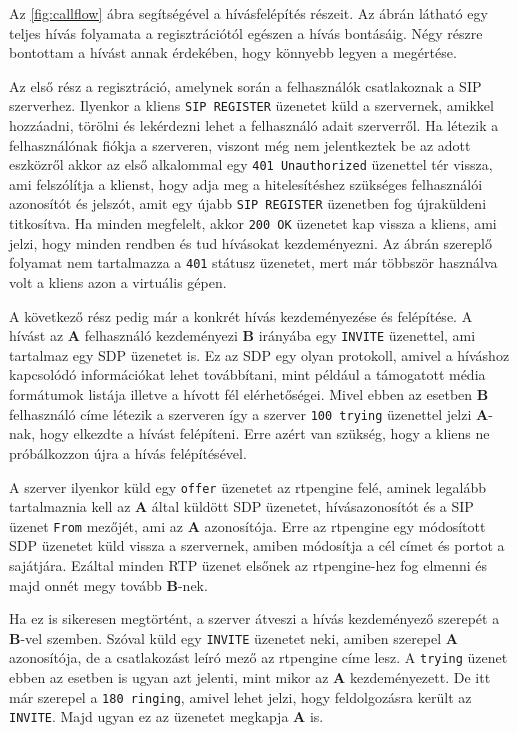 Az \ref{fig:callflow} ábra segítségével a hívásfelépítés részeit.  Az ábrán látható 
egy teljes hívás folyamata a regisztrációtól egészen a hívás bontásáig. Négy részre 
bontottam a hívást annak érdekében, hogy könnyebb legyen a megértése.

Az első rész a regisztráció, amelynek során a felhasználók csatlakoznak a SIP szerverhez.
Ilyenkor a kliens \texttt{SIP REGISTER} üzenetet küld a szervernek, amikkel hozzáadni, 
törölni és lekérdezni lehet a felhasználó adait szerverről. Ha létezik a felhasználónak 
fiókja a szerveren, viszont még nem jelentkeztek be az adott eszközről akkor az első 
alkalommal egy \texttt{401 Unauthorized} üzenettel tér vissza, ami felszólítja a klienst, 
hogy adja meg a hitelesítéshez szükséges felhasználói azonosítót és jelszót, amit egy 
újabb \texttt{SIP REGISTER} üzenetben fog újraküldeni titkosítva. Ha minden megfelelt, 
akkor \texttt{200 OK} üzenetet kap vissza a kliens, ami jelzi, hogy minden rendben és tud 
hívásokat kezdeményezni. Az ábrán szereplő folyamat nem tartalmazza a \texttt{401} 
státusz üzenetet, mert már többször használva volt a kliens azon a virtuális gépen.

A következő rész pedig már a konkrét hívás kezdeményezése és felépítése. A hívást az 
\textbf{A} felhasználó kezdeményezi \textbf{B} irányába egy \texttt{INVITE} üzenettel, 
ami tartalmaz egy SDP üzenetet is. Ez az SDP egy olyan protokoll, amivel a híváshoz 
kapcsolódó információkat lehet továbbítani, mint például a támogatott média formátumok 
listája illetve a hívott fél elérhetőségei. Mivel ebben az esetben \textbf{B} felhasználó 
címe létezik a szerveren így a szerver \texttt{100 trying} üzenettel jelzi 
\textbf{A}-nak, hogy elkezdte a hívást felépíteni. Erre azért van szükség, hogy a kliens 
ne próbálkozzon újra a hívás felépítésével.

A szerver ilyenkor küld egy \texttt{offer} üzenetet az rtpengine felé, aminek legalább 
tartalmaznia kell az \textbf{A} által küldött SDP üzenetet, hívásazonosítót és a SIP 
üzenet \texttt{From} mezőjét, ami az \textbf{A} azonosítója. Erre az rtpengine egy 
módosított SDP üzenetet küld vissza a szervernek, amiben módosítja a cél címet és portot 
a sajátjára. Ezáltal minden RTP üzenet elsőnek az rtpengine-hez fog elmenni és majd onnét 
megy tovább \textbf{B}-nek.

Ha ez is sikeresen megtörtént, a szerver átveszi a hívás kezdeményező szerepét a 
\textbf{B}-vel szemben. Szóval küld egy \texttt{INVITE} üzenetet neki, amiben szerepel 
\textbf{A} azonosítója, de a csatlakozást leíró mező az rtpengine címe lesz. A 
\texttt{trying} üzenet ebben az esetben is ugyan azt jelenti, mint mikor az \textbf{A} 
kezdeményezett. De itt már szerepel a \texttt{180 ringing}, amivel lehet jelzi, hogy 
feldolgozásra került az \texttt{INVITE}. Majd ugyan ez az üzenetet megkapja \textbf{A} 
is. 


